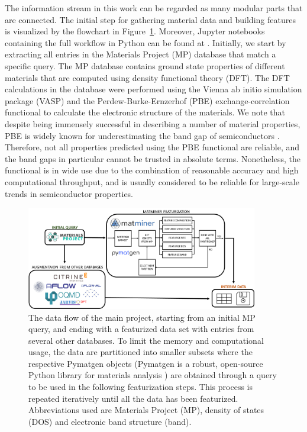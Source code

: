\documentclass[superscriptaddress,unsortedaddress,
 amsmath,amssymb,
 aps,
]{revtex4-2}
\begin{document}
The information stream in this work can be regarded as many modular parts that are connected. 
The initial step for gathering material data and building features is visualized by the  flowchart in Figure~\ref{fig:flowchart}. Moreover, Jupyter notebooks containing the full
workflow in Python can be found at \cite{Ohebbi2021}.
Initially, we start by extracting all entries in the Materials Project (MP) database that match a specific query. 
The MP database contains ground state properties of different materials that are computed using density functional theory (DFT). The DFT calculations in the database were performed using the Vienna ab initio simulation package (VASP) \cite{Kresse1996} and the Perdew-Burke-Ernzerhof (PBE) \cite{Perdew1996} exchange-correlation functional to calculate the electronic structure of the materials. 
We note that despite being immensely successful in describing a number of material properties, PBE is widely known for underestimating the band gap of semiconductors \cite{Freysoldt2014}. Therefore, not all properties predicted using the PBE functional are reliable, and the band gaps in particular cannot be trusted in absolute terms. Nonetheless, the functional is in wide use due to the combination of reasonable accuracy and high computational throughput, and is usually considered to be reliable for large-scale trends in semiconductor properties. 

\begin{figure}[t]
    \centering
    \includegraphics[width=0.9\textwidth]{figures/flow_chart_2.png}
    \caption{The data flow of the main project, starting from an initial MP query, and ending with a featurized data set with entries from several other databases. To limit the memory and computational usage, the data are partitioned into smaller subsets where the respective Pymatgen objects  
    (Pymatgen is a robust, open-source Python library for materials analysis \cite{pymatgen}) 
    are obtained through a query to be used in the following featurization steps. This process is repeated iteratively until all the data has been featurized. Abbreviations used are Materials Project (MP), density of states (DOS) and electronic band structure (band).
    }
    \label{fig:flowchart}
\end{figure}
\end{document}
